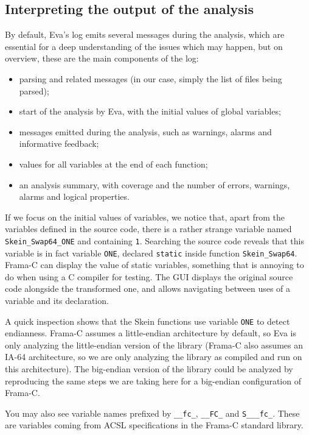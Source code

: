 \documentclass[web]{frama-c-book}
\newcommand{\Eva}{\textsf{Eva}}
\begin{document}
\subsection{Interpreting the output of the analysis}

By default, \Eva{}'s log emits several messages during the analysis, which are
essential for a deep understanding of the issues which may happen, but on
overview, these are the main components of the log:

\begin{itemize}
\item parsing and related messages (in our case, simply the list of files being
  parsed);
\item start of the analysis by \Eva{}, with the initial values of global
  variables;
\item messages emitted during the analysis, such as warnings, alarms and
  informative feedback;
\item values for all variables at the end of each function;
\item an analysis summary, with coverage and the number of
  errors, warnings, alarms and logical properties.
\end{itemize}

If we focus on the initial values of variables, we notice that,
apart from the variables defined in the source code, there
is a rather strange variable named \lstinline|Skein_Swap64_ONE| and containing
\lstinline|1|. Searching the source code reveals that this variable is
in fact variable \verb|ONE|, declared \lstinline|static| inside function
\lstinline|Skein_Swap64|. Frama-C can
display the value of static variables, something that is annoying to
do when using a C compiler for testing.
The GUI displays the original source code alongside the transformed one,
and allows navigating between uses of a variable and its declaration.

A quick inspection shows that the Skein functions
use variable \lstinline|ONE| to detect endianness.
Frama-C assumes a little-endian architecture
by default, so \Eva{} is only analyzing the
little-endian version of the library (Frama-C
also assumes an IA-64 architecture, so we are only
analyzing the library as compiled and run on this architecture).
The big-endian version of the library could be analyzed
by reproducing the same steps we are taking here for
a big-endian configuration of Frama-C.

You may also see variable names
prefixed by \verb|__fc_|, \verb|__FC_| and \verb|S___fc_|.
These are variables coming from ACSL specifications in the Frama-C
standard library.
\end{document}
